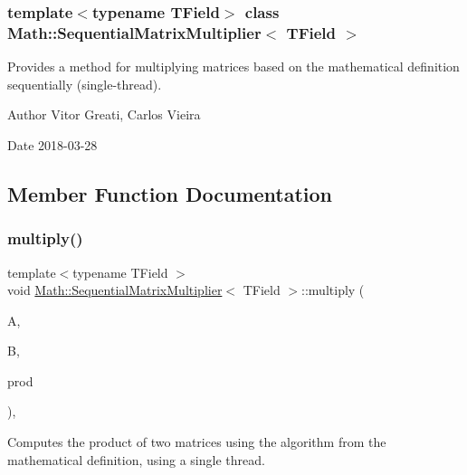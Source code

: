 \subsubsection*{template$<$typename T\+Field$>$\newline
class Math\+::\+Sequential\+Matrix\+Multiplier$<$ T\+Field $>$}

Provides a method for multiplying matrices based on the mathematical definition sequentially (single-\/thread). 

\begin{DoxyAuthor}{Author}
Vitor Greati, Carlos Vieira 
\end{DoxyAuthor}
\begin{DoxyDate}{Date}
2018-\/03-\/28 
\end{DoxyDate}


\subsection{Member Function Documentation}
\mbox{\label{classMath_1_1SequentialMatrixMultiplier_ac50584976bf8efe3a0a755048c427753}} 
\subsubsection{\texorpdfstring{multiply()}{multiply()}}
{\footnotesize\ttfamily template$<$typename T\+Field $>$ \\
void \mbox{\hyperlink{classMath_1_1SequentialMatrixMultiplier}{Math\+::\+Sequential\+Matrix\+Multiplier}}$<$ T\+Field $>$\+::multiply (\begin{DoxyParamCaption}\item[{const \mbox{\hyperlink{classMath_1_1Matrix}{Matrix}}$<$ T\+Field $>$ \&}]{A,  }\item[{const \mbox{\hyperlink{classMath_1_1Matrix}{Matrix}}$<$ T\+Field $>$ \&}]{B,  }\item[{\mbox{\hyperlink{classMath_1_1Matrix}{Matrix}}$<$ T\+Field $>$ \&}]{prod }\end{DoxyParamCaption})\hspace{0.3cm}{\ttfamily [inline]}, {\ttfamily [virtual]}}



Computes the product of two matrices using the algorithm from the mathematical definition, using a single thread. 


